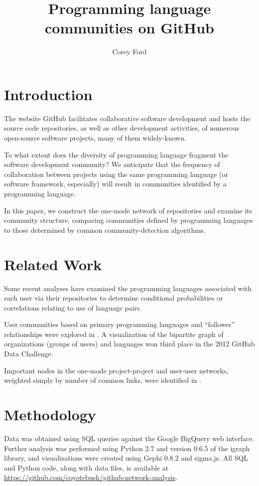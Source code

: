 \documentclass[11pt]{article}
\title{Programming language communities on GitHub}
\author{Corey Ford}
\begin{document}
\maketitle

\section{Introduction}

The website GitHub facilitates collaborative software development and hosts the
source code repositories, as well as other development activities, of numerous
open-source software projects, many of them widely-known.

To what extent does the diversity of programming language fragment the software
development community? We anticipate that the frequency of collaboration between
projects using the same programming language (or software framework, especially)
will result in communities identified by a programming language.

In this paper, we construct the one-mode network of repositories and examine its
community structure, comparing communities defined by programming languages to
those determined by common community-detection algorithms.

\section{Related Work}
Some recent analyses have examined the programming languages associated with
each user via their repositories to determine conditional probabilities
\cite{doll12} or correlations \cite{shah13} relating to use of language pairs.

User communities based on primary programming languages and ``follower''
relationships were explored in \cite{cuny10,weber12}.  A visualization of the
bipartite graph of organizations (groups of users) and languages
\cite{rodrigues12} won third place in the 2012 GitHub Data Challenge.

Important nodes in the one-mode project-project and user-user networks, weighted
simply by number of common links, were identified in \cite{thung2013}.

\section{Methodology}
Data was obtained using SQL queries against the Google BigQuery web interface.
Further analysis was performed using Python 2.7 and version 0.6.5 of the igraph
library, and visualizations were created using Gephi 0.8.2 and sigma.js. All SQL
and Python code, along with data files, is available at
\url{https://github.com/coyotebush/github-network-analysis}.
\end{document}
